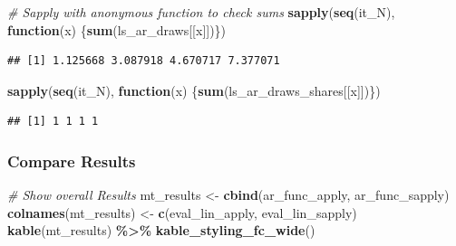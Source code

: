 \documentclass[
]{book}
\newenvironment{Shaded}{\begin{snugshade}}{\end{snugshade}}
\newcommand{\CommentTok}[1]{\textcolor[rgb]{0.56,0.35,0.01}{\textit{#1}}}
\newcommand{\ControlFlowTok}[1]{\textcolor[rgb]{0.13,0.29,0.53}{\textbf{#1}}}
\newcommand{\KeywordTok}[1]{\textcolor[rgb]{0.13,0.29,0.53}{\textbf{#1}}}
\newcommand{\NormalTok}[1]{#1}
\newcommand{\OperatorTok}[1]{\textcolor[rgb]{0.81,0.36,0.00}{\textbf{#1}}}
\newcommand{\StringTok}[1]{\textcolor[rgb]{0.31,0.60,0.02}{#1}}
\begin{document}
\begin{Shaded}
\begin{Highlighting}[]
\CommentTok{\# Sapply with anonymous function to check sums}
\KeywordTok{sapply}\NormalTok{(}\KeywordTok{seq}\NormalTok{(it\_N), }\ControlFlowTok{function}\NormalTok{(x) \{}\KeywordTok{sum}\NormalTok{(ls\_ar\_draws[[x]])\})}
\end{Highlighting}
\end{Shaded}

\begin{verbatim}
## [1] 1.125668 3.087918 4.670717 7.377071
\end{verbatim}

\begin{Shaded}
\begin{Highlighting}[]
\KeywordTok{sapply}\NormalTok{(}\KeywordTok{seq}\NormalTok{(it\_N), }\ControlFlowTok{function}\NormalTok{(x) \{}\KeywordTok{sum}\NormalTok{(ls\_ar\_draws\_shares[[x]])\})}
\end{Highlighting}
\end{Shaded}

\begin{verbatim}
## [1] 1 1 1 1
\end{verbatim}

\hypertarget{compare-results}{%
\subsubsection{Compare Results}\label{compare-results}}

\begin{Shaded}
\begin{Highlighting}[]
\CommentTok{\# Show overall Results}
\NormalTok{mt\_results \textless{}{-}}\StringTok{ }\KeywordTok{cbind}\NormalTok{(ar\_func\_apply, ar\_func\_sapply)}
\KeywordTok{colnames}\NormalTok{(mt\_results) \textless{}{-}}\StringTok{ }\KeywordTok{c}\NormalTok{(}\StringTok{\textquotesingle{}eval\_lin\_apply\textquotesingle{}}\NormalTok{, }\StringTok{\textquotesingle{}eval\_lin\_sapply\textquotesingle{}}\NormalTok{)}
\KeywordTok{kable}\NormalTok{(mt\_results) }\OperatorTok{\%\textgreater{}\%}
\StringTok{  }\KeywordTok{kable\_styling\_fc\_wide}\NormalTok{()}
\end{Highlighting}
\end{Shaded}

\begin{table}[!h]
\centering
{}
\end{table}
\end{document}
